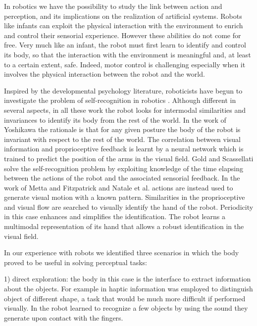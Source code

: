 In robotics we have the possibility to study the link between action and perception, and its implications on the realization of artificial systems. Robots like infants can exploit the physical interaction with the environment to enrich and control their sensorial experience. However these abilities do not come for free. Very much like an infant, the robot must first learn to identify and control its body, so that the interaction with the environment is meaningful and, at least to a certain extent, safe. Indeed, motor control is challenging especially when it involves the physical interaction between the robot and the world. 

Inspired by the developmental psychology literature, roboticists have begun to investigate the problem of self-recognition in robotics \cite{yoshikawa03doestheinvariance,metta03early,natale05exploring,gold05learning}. Although different in several aspects, in all these work the robot looks for intermodal similarities and invariances to identify its body from the rest of the world.
In the work of Yoshikawa \cite{yoshikawa03doestheinvariance} the rationale is that for any given posture the body of the robot is invariant with respect to the rest of the world. The correlation between visual information and proprioceptive feedback is learnt by a neural network which is trained to predict the position of the arms in the visual field.
Gold and Scassellati \cite{gold05learning} solve the self-recognition problem by exploiting knowledge of the time elapsing between the actions of the robot and the associated sensorial feedback.
In the work of Metta and Fitzpatrick \cite{metta03early} and Natale et al. \cite{natale05exploring} actions are instead used to generate visual motion with a known pattern. Similarities in the proprioceptive and visual flow are searched to visually identify the hand of the robot. Periodicity in this case enhances and simplifies the identification. The robot learns a multimodal representation of its hand that allows a robust identification in the visual field.

In our experience with robots we identified three scenarios in which the body proved to be useful in solving perceptual tasks:

1) direct exploration: the body in this case is the interface to extract information about the objects. For example in \cite{natale04learning} haptic information was employed to distinguish object of different shape, a task that would be much more difficult if performed visually. In \cite{torres-jara05tapping} the robot learned to recognize a few objects by using the sound they generate upon contact with the fingers.

